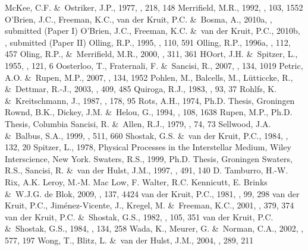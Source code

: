 \documentclass[traditabstract]{aa} %
\begin{document}
\begin{thebibliography}{}
McKee, C.F. \&\ Ostriker, J.P., 1977, \apj, 218, 148
Merrifield, M.R., 1992, \aj, 103, 1552
O'Brien, J.C., Freeman, K.C., van der Kruit, P.C. \&\ Bosma, A., 2010a, \aap, submitted
(Paper I) 
O'Brien, J.C., Freeman, K.C. \&\ van der Kruit, P.C., 2010b, \aap, submitted 
(Paper II)
Olling, R.P., 1995, \aj, 110, 591
Olling, R.P., 1996a, \aj, 112, 457
Oling, R.P., \&\ Merrifield, M.R., 2000, \mnras, 311, 361
HOort, J.H. \&\ Spitzer, L., 1955, \apj, 121, 6
Oosterloo, T., Fraternali, F. \&\ Sancisi, R., 2007, \aj, 134, 1019
Petric, A.O. \&\ Rupen, M.P., 2007, \aj, 134, 1952
Pohlen, M., Balcells, M., L\"utticcke, R., \&\ Dettmar, R.-J., 2003, \aap,
409, 485
Quiroga, R.J., 1983, \apss, 93, 37
Rohlfs, K. \&\ Kreitschmann, J., 1987, \aap, 178, 95 
Rots, A.H., 1974, Ph.D. Thesis, Groningen 
Rownd, B.K., Dickey, J.M. \&\ Helou, G., 1994, \aj, 108, 1638
Rupen, M.P., Ph.D. Thesis, Columbia 
Sancisi, R. \&\ Allen, R.J., 1979, \aap, 74, 73
Sellwood, J.A. \&\ Balbus, S.A., 1999, \apj, 511, 660
Shostak, G.S. \&\ van der Kruit, P.C., 1984, \aap, 132, 20
Spitzer, L., 1978, Physical Processes in the Interstellar Medium, Wiley
Interscience, New York.
Swaters, R.S., 1999, Ph.D. Thesis, Groningen
Swaters, R.S., Sancisi, R. \&\ van der Hulst, J.M., 1997, \apj, 491, 140
D. Tamburro, H.-W. Rix, A.K. Leroy, M.-M. Mac Low, F. Walter, R.C. Kennicutt, 
E. Brinks \&\ W.J.G. de Blok, 2009, \aj, 137, 4424
van der Kruit, P.C., 1981, \aap, 99, 298
van der Kruit, P.C., Jim\'enez-Vicente, J., Kregel, M. \&\ Freeman, K.C.,
2001, \aap, 379, 374
van der Kruit, P.C. \&\ Shostak, G.S., 1982, \aap, 105, 351
van der Kruit, P.C. \&\ Shostak, G.S., 1984, \aap, 134, 258
Wada, K., Meurer, G. \&\ Norman, C.A., 2002, \apj, 577, 197
Wong, T., Blitz, L. \&\ van der Hulst, J.M., 2004, \apss, 289, 211 
\end{thebibliography}
\end{document}
